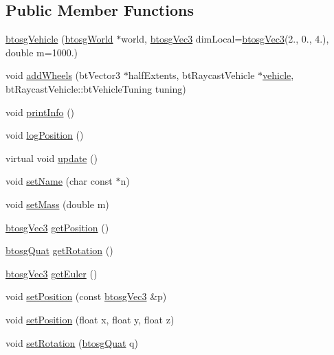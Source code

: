 \subsection*{Public Member Functions}
\begin{DoxyCompactItemize}
\item 
\hyperlink{classbtosgVehicle_aa754dd94553b8690763e4c24d1f26227}{btosg\+Vehicle} (\hyperlink{classbtosgWorld}{btosg\+World} $\ast$world, \hyperlink{classbtosgVec3}{btosg\+Vec3} dim\+Local=\hyperlink{classbtosgVec3}{btosg\+Vec3}(2., 0., 4.), double m=1000.)
\item 
void \hyperlink{classbtosgVehicle_a98971fb952c08cb72341a0c333fc66de}{add\+Wheels} (bt\+Vector3 $\ast$half\+Extents, bt\+Raycast\+Vehicle $\ast$\hyperlink{classbtosgVehicle_ac45b117f8b523f7040de99639deb7522}{vehicle}, bt\+Raycast\+Vehicle\+::bt\+Vehicle\+Tuning tuning)
\item 
void \hyperlink{classbtosgVehicle_abe98f64f0a8f37c7c0b244e3afbbcb15}{print\+Info} ()
\item 
void \hyperlink{classbtosgVehicle_ae9168c62263b26f95d068d94d6a7cab7}{log\+Position} ()
\item 
virtual void \hyperlink{classbtosgVehicle_a5fd0f471df492ac232c9b772a28bd2b9}{update} ()
\item 
void \hyperlink{classbtosgObject_ab06a1b3f357209214c6440cd5746523e}{set\+Name} (char const $\ast$n)
\item 
void \hyperlink{classbtosgObject_a91da93c82d48b86192f0cbb16054fe57}{set\+Mass} (double m)
\item 
\hyperlink{classbtosgVec3}{btosg\+Vec3} \hyperlink{classbtosgObject_a3dadd5da8f2a312e44a039446b93d4cd}{get\+Position} ()
\item 
\hyperlink{classbtosgQuat}{btosg\+Quat} \hyperlink{classbtosgObject_a3b825999ad3a51bde743d4085ff19dae}{get\+Rotation} ()
\item 
\hyperlink{classbtosgVec3}{btosg\+Vec3} \hyperlink{classbtosgObject_a2019ec63bde02b72600450c7c985e77a}{get\+Euler} ()
\item 
void \hyperlink{classbtosgObject_ace6b51040b7ddce90818174200cc6074}{set\+Position} (const \hyperlink{classbtosgVec3}{btosg\+Vec3} \&p)
\item 
void \hyperlink{classbtosgObject_adb9f2cff0faf66dc252cd7c97b11ac84}{set\+Position} (float x, float y, float z)
\item 
void \hyperlink{classbtosgObject_a6365748d5506bb9da31907c9988071fa}{set\+Rotation} (\hyperlink{classbtosgQuat}{btosg\+Quat} q)
\item 

\end{DoxyCompactItemize}
